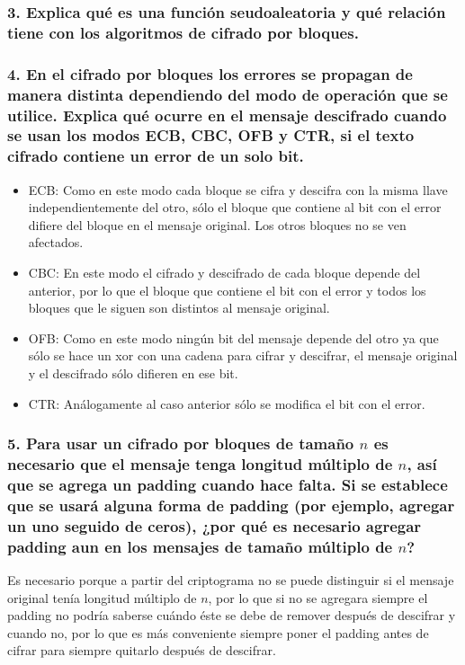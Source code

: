 \documentclass[12pt]{article}
\begin{document}
\subsubsection*{3. Explica qué es una función seudoaleatoria y qué relación tiene con los algoritmos de cifrado por bloques.}


\subsubsection*{4. En el cifrado por bloques los errores se propagan de manera distinta dependiendo del modo de operación que se utilice. Explica qué ocurre en el mensaje descifrado cuando se usan los modos ECB, CBC, OFB y CTR, si el texto cifrado contiene un error de un solo bit.}
\begin{itemize}
\item ECB: Como en este modo cada bloque se cifra y descifra con la misma llave independientemente del otro, sólo el bloque que contiene al bit con el error difiere del bloque en el mensaje original. Los otros bloques no se ven afectados.
\item CBC: En este modo el cifrado y descifrado de cada bloque depende del anterior, por lo que el bloque que contiene el bit con el error y todos los bloques que le siguen son distintos al mensaje original.
\item OFB: Como en este modo ningún bit del mensaje depende del otro ya que sólo se hace un xor con una cadena para cifrar y descifrar, el mensaje original y el descifrado sólo difieren en ese bit.
\item CTR: Análogamente al caso anterior sólo se modifica el bit con el error.
\end{itemize}

\subsubsection*{5. Para usar un cifrado por bloques de tamaño $n$ es necesario que el mensaje tenga longitud múltiplo de $n$, así que se agrega un padding cuando hace falta. Si se establece que se usará alguna forma de padding (por ejemplo, agregar un uno seguido de ceros), ¿por qué es necesario agregar padding aun en los mensajes de tamaño múltiplo de $n$?}
Es necesario porque a partir del criptograma no se puede distinguir si el mensaje original tenía longitud múltiplo de $n$, por lo que si no se agregara siempre el padding no podría saberse cuándo éste se debe de remover después de descifrar y cuando no, por lo que es más conveniente siempre poner el padding antes de cifrar para siempre quitarlo después de descifrar.
\end{document}
